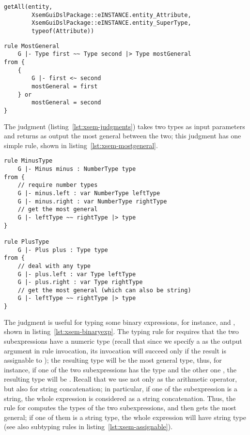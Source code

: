 \begin{lstlisting}[language=xsemantics] 
	getAll(entity, 
		XsemGuiDslPackage::eINSTANCE.entity_Attribute,
		XsemGuiDslPackage::eINSTANCE.entity_SuperType,
		typeof(Attribute))
\end{lstlisting}

\begin{lstlisting}[language=xsemantics,float,label=lst:xsem-mostgeneral,caption=Rule
for \mytt{mostGeneral}.] 
rule MostGeneral
	G |- Type first ~~ Type second |> Type mostGeneral
from {
	{
		G |- first <~ second
		mostGeneral = first
	} or
		mostGeneral = second
}
\end{lstlisting}

The judgment  (listing~\ref{lst:xsem-judgments}) takes two
types as input parameters and returns as output the most general between the
two; this judgment has one simple rule, shown in
listing~\ref{lst:xsem-mostgeneral}.

\begin{lstlisting}[language=xsemantics,float,label=lst:xsem-binaryexp,caption=Some
rules for binary expressions.] 
rule MinusType
	G |- Minus minus : NumberType type
from {
	// require number types
	G |- minus.left : var NumberType leftType
	G |- minus.right : var NumberType rightType
	// get the most general
	G |- leftType ~~ rightType |> type
}

rule PlusType
	G |- Plus plus : Type type
from {
	// deal with any type
	G |- plus.left : var Type leftType
	G |- plus.right : var Type rightType
	// get the most general (which can also be string)
	G |- leftType ~~ rightType |> type
}
\end{lstlisting}

The judgment  is useful for typing some binary expressions,
for instance,  and , shown in
listing~\ref{lst:xsem-binaryexp}.  The typing rule for  requires
that the two subexpressions have a numeric type (recall that since we specify a
 as the output argument in rule invocation, its invocation
will succeed only if the result is assignable to ); the
resulting type will be the most general type, thus, for instance, if one of the
two subexpressions has the type  and the other one
, the resulting type will be .  Recall that we use \mytt{+} not
only as the arithmetic operator, but also for string concatenation; in
particular, if one of the subexpression is a string, the whole expression is
considered as a string concatenation.  Thus, the rule for 
computes the types of the two subexpressions, and then gets the most general; if one of them
is a string type, the whole expression will have string type (see also subtyping
rules in listing~\ref{lst:xsem-assignable}).

